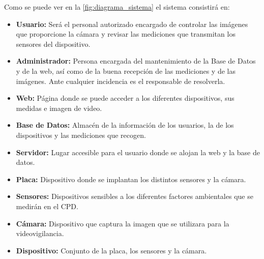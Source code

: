 \begin{figure}[H]
{}
\end{figure}

Como se puede ver en la \autoref{fig:diagrama_sistema} el sistema consistirá en:
\begin{itemize}
	\item \textbf{Usuario:} Será el personal autorizado encargado de controlar las imágenes que proporcione la cámara y revisar las mediciones que transmitan los sensores del dispositivo.
	\item \textbf{Administrador:} Persona encargada del mantenimiento de la Base de Datos y de la web, así como de la buena recepción de las mediciones y de las imágenes. Ante cualquier incidencia es el responsable de resolverla.
	\item \textbf{Web:} Página donde se puede acceder a los diferentes dispositivos, sus medidas e imagen de video.
	\item \textbf{Base de Datos:} Almacén de la información de los usuarios, la de los dispositivos y las mediciones que recogen.
	\item \textbf{Servidor:} Lugar accesible para el usuario donde se alojan la web y la base de datos.
	\item \textbf{Placa:} Dispositivo donde se implantan los distintos sensores y la cámara.
	\item \textbf{Sensores:} Dispositivos sensibles a los diferentes factores ambientales que se medirán en el CPD.
	\item \textbf{Cámara:} Dispositivo que captura la imagen que se utilizara para la videovigilancia.
	\item \textbf{Dispositivo:} Conjunto de la placa, los sensores y la cámara.
\end{itemize}

